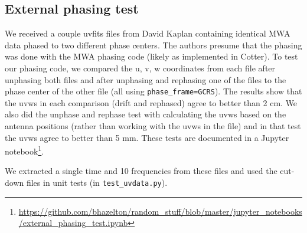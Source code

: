 \documentclass[11pt, oneside]{article}   	%
\begin{document}
\subsection{External phasing test}
We received a couple uvfits files from David Kaplan containing identical MWA data phased to two different phase centers. The authors presume that the phasing was done with the MWA phasing code (likely as implemented in Cotter). To test our phasing code, we compared the u, v, w coordinates from each file after unphasing both files and after unphasing and rephasing one of the files to the phase center of the other file (all using \verb!phase_frame=GCRS!). The results show that the uvws in each comparison (drift and rephased) agree to better than 2 cm. We also did the unphase and rephase test with calculating the uvws based on the antenna positions (rather than working with the uvws in the file) and in that test the uvws agree to better than 5 mm. These tests are documented in a Jupyter notebook\footnote{\url{https://github.com/bhazelton/random_stuff/blob/master/jupyter_notebooks/external_phasing_test.ipynb}}.

We extracted a single time and 10 frequencies from these files and used the cut-down files in unit tests (in \verb!test_uvdata.py!).
\end{document}
